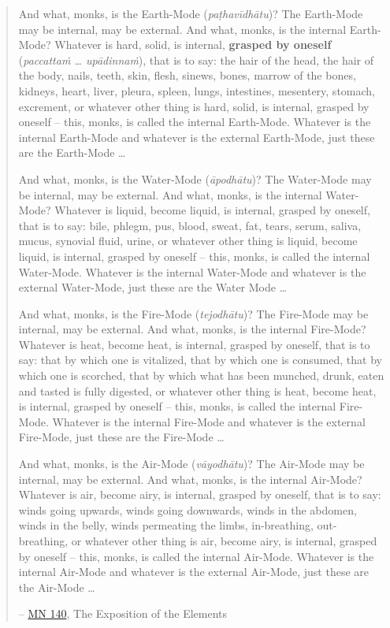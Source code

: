 \begin{quote}
And what, monks, is the Earth-Mode (\emph{paṭhavīdhātu})? The Earth-Mode may be internal, may be external. And what, monks, is the internal Earth-Mode? Whatever is hard, solid, is internal, \textbf{grasped by oneself} (\emph{paccattaṁ \ldots{} upādinnaṁ}), that is to say: the hair of the head, the hair of the body, nails, teeth, skin, flesh, sinews, bones, marrow of the bones, kidneys, heart, liver, pleura, spleen, lungs, intestines, mesentery, stomach, excrement, or whatever other thing is hard, solid, is internal, grasped by oneself -- this, monks, is called the internal Earth-Mode. Whatever is the internal Earth-Mode and whatever is the external Earth-Mode, just these are the Earth-Mode \ldots{}

And what, monks, is the Water-Mode (\emph{āpodhātu})? The Water-Mode may be internal, may be external. And what, monks, is the internal Water-Mode? Whatever is liquid, become liquid, is internal, grasped by oneself, that is to say: bile, phlegm, pus, blood, sweat, fat, tears, serum, saliva, mucus, synovial fluid, urine, or whatever other thing is liquid, become liquid, is internal, grasped by oneself -- this, monks, is called the internal Water-Mode. Whatever is the internal Water-Mode and whatever is the external Water-Mode, just these are the Water Mode \ldots{}

And what, monks, is the Fire-Mode (\emph{tejodhātu})? The Fire-Mode may be internal, may be external. And what, monks, is the internal Fire-Mode? Whatever is heat, become heat, is internal, grasped by oneself, that is to say: that by which one is vitalized, that by which one is consumed, that by which one is scorched, that by which what has been munched, drunk, eaten and tasted is fully digested, or whatever other thing is heat, become heat, is internal, grasped by oneself -- this, monks, is called the internal Fire-Mode. Whatever is the internal Fire-Mode and whatever is the external Fire-Mode, just these are the Fire-Mode \ldots{}

And what, monks, is the Air-Mode (\emph{vāyodhātu})? The Air-Mode may be internal, may be external. And what, monks, is the internal Air-Mode? Whatever is air, become airy, is internal, grasped by oneself, that is to say: winds going upwards, winds going downwards, winds in the abdomen, winds in the belly, winds permeating the limbs, in-breathing, out-breathing, or whatever other thing is air, become airy, is internal, grasped by oneself -- this, monks, is called the internal Air-Mode. Whatever is the internal Air-Mode and whatever is the external Air-Mode, just these are the Air-Mode \ldots{}

 -- \href{https://suttacentral.net/mn140/en/bodhi}{MN 140}, The Exposition of the Elements
\end{quote}

